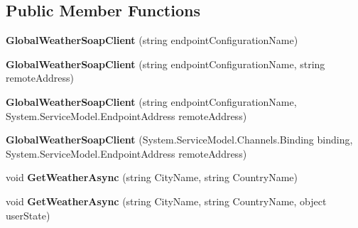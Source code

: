 \subsection*{Public Member Functions}
\begin{DoxyCompactItemize}
\item 
\hypertarget{class_silverlight_showcase_1_1_sample_weather_service_1_1_global_weather_soap_client_a424fe06287651bccce8087a77fd04cec}{
{\bfseries GlobalWeatherSoapClient} (string endpointConfigurationName)}
\label{class_silverlight_showcase_1_1_sample_weather_service_1_1_global_weather_soap_client_a424fe06287651bccce8087a77fd04cec}

\item 
\hypertarget{class_silverlight_showcase_1_1_sample_weather_service_1_1_global_weather_soap_client_aa77c939503e7b284b02e263ed2286c95}{
{\bfseries GlobalWeatherSoapClient} (string endpointConfigurationName, string remoteAddress)}
\label{class_silverlight_showcase_1_1_sample_weather_service_1_1_global_weather_soap_client_aa77c939503e7b284b02e263ed2286c95}

\item 
\hypertarget{class_silverlight_showcase_1_1_sample_weather_service_1_1_global_weather_soap_client_ace99899560a4801c537c5f9a23365623}{
{\bfseries GlobalWeatherSoapClient} (string endpointConfigurationName, System.ServiceModel.EndpointAddress remoteAddress)}
\label{class_silverlight_showcase_1_1_sample_weather_service_1_1_global_weather_soap_client_ace99899560a4801c537c5f9a23365623}

\item 
\hypertarget{class_silverlight_showcase_1_1_sample_weather_service_1_1_global_weather_soap_client_af5292aa942374ab2b4973d5a96e56c1a}{
{\bfseries GlobalWeatherSoapClient} (System.ServiceModel.Channels.Binding binding, System.ServiceModel.EndpointAddress remoteAddress)}
\label{class_silverlight_showcase_1_1_sample_weather_service_1_1_global_weather_soap_client_af5292aa942374ab2b4973d5a96e56c1a}

\item 
\hypertarget{class_silverlight_showcase_1_1_sample_weather_service_1_1_global_weather_soap_client_ac8295bb4eca62d8a361db78fc7889344}{
void {\bfseries GetWeatherAsync} (string CityName, string CountryName)}
\label{class_silverlight_showcase_1_1_sample_weather_service_1_1_global_weather_soap_client_ac8295bb4eca62d8a361db78fc7889344}

\item 
\hypertarget{class_silverlight_showcase_1_1_sample_weather_service_1_1_global_weather_soap_client_acb2173d10c109d1168d25e156970b491}{
void {\bfseries GetWeatherAsync} (string CityName, string CountryName, object userState)}
\label{class_silverlight_showcase_1_1_sample_weather_service_1_1_global_weather_soap_client_acb2173d10c109d1168d25e156970b491}


\end{DoxyCompactItemize}
